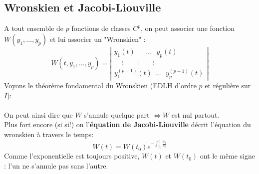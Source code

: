 \documentclass[british,french,11pt, a4paper, openany]{book}
\begin{document}
\subsection{Wronskien et Jacobi-Liouville}
A tout ensemble de $p$ fonctions de classes $C^p$, on peut associer une fonction $W(y_1, \dots, y_p)$ et lui associer un "Wronskien" :
\begin{equation}
	W(t, y_1,\dots,y_p) = \left|\begin{array}{l}
	y_1(t)\ \ \   \ \ \  \  \dots  \  \ \  y_p(t)\\
	\ \ \ \ \ \vdots\ \ \ \ \ \ \ \ \ \vdots\ \ \ \ \ \ \ \ \ \vdots\\
	y_1^{(p-1)}(t)\ \ \dots\ \ \ y_p^{(p-1)}(t)
	\end{array}\right|
\end{equation}
Voyons le théorème fondamental du Wronskien (EDLH d'ordre $p$ et régulière sur $I$): \\
\ \\
		
On peut ainsi dire que $W$ s'annule quelque part $\Leftrightarrow W$ est nul partout.\\
		
Plus fort encore (si si!) on l'\textbf{équation de Jacobi-Liouville} décrit l'équation du wronskien à travers le temps:
\begin{equation}
	W(t) = W(t_0)e^{-\int_{t_0}^t \frac{a_1}{a_0}}
\end{equation}
Comme l'exponentielle est toujours positive, $W(t)$ et $W(t_0)$ ont le même signe : l'un ne s'annule pas sans l'autre.
		
\end{document}
